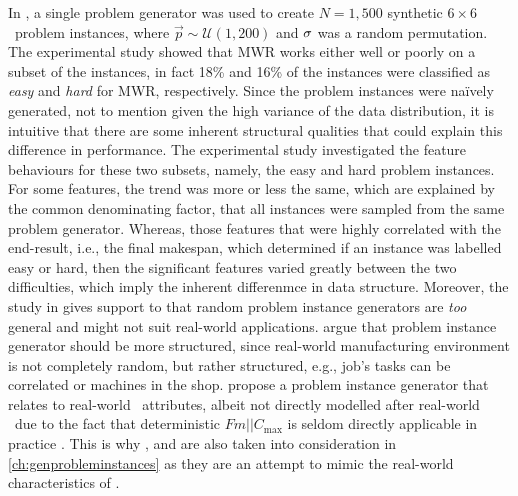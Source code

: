In \citet{InRu12}, a single problem generator was used to create  $N=1,500$ synthetic $6\times6$ \jsp\ problem instances, where $\vec{p}\sim\mathcal{U}(1,200)$ and ${\mathbf{\sigma}}$ was a random permutation. The experimental study showed that MWR works either well or poorly on a subset of the instances, in fact 18\% and 16\% of the instances were classified as \emph{easy} and \emph{hard} for MWR, respectively. 
Since the problem instances were na\"{i}vely generated, not to mention given 
the high variance of the data distribution, it is intuitive that there are some 
inherent structural qualities that could explain this difference in 
performance. The experimental study investigated the feature behaviours for 
these two subsets, namely, the easy and hard problem instances. For some 
features, the trend was more or less the same, which are explained by the 
common denominating factor, that all instances were sampled from the same 
problem generator. Whereas, those features that were highly correlated with the 
end-result, i.e., the final makespan, which determined if an instance was 
labelled easy or hard, then the significant features varied greatly between the 
two difficulties, which imply the inherent differenmce in data structure. 
Moreover, the study in gives support to that random problem instance generators are \emph{too} general and might not suit real-world applications. \citet{Whitley} argue that problem instance generator should be more structured, since real-world manufacturing environment is not completely random, but rather structured, e.g.,  job's tasks can be correlated or machines in the shop. \citeauthor{Whitley} propose a problem instance generator that relates to real-world \fsp\ attributes, albeit not directly modelled after real-world \fsp\ due to the fact that deterministic $Fm||C_{\max}$ is seldom directly applicable in practice \citep{Dudek92}. This is why ,  and  are also taken into consideration in \cref{ch:genprobleminstances} as they are an attempt to mimic the real-world characteristics of \fsp.

